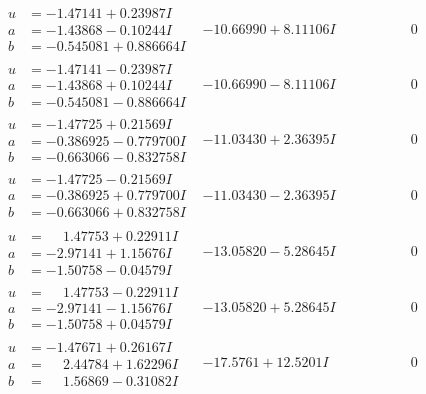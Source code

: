 \documentclass[1p]{elsarticle_modified}
\theoremstyle{definition}
\begin{document}
$$\begin{array}{c|c|c}
\begin{aligned}
u &= -1.47141 + 0.23987 I \\
a &= -1.43868 - 0.10244 I \\
b &= -0.545081 + 0.886664 I\end{aligned}
 & -10.66990 + 8.11106 I & \phantom{-0.000000 } 0 \\ \hline\begin{aligned}
u &= -1.47141 - 0.23987 I \\
a &= -1.43868 + 0.10244 I \\
b &= -0.545081 - 0.886664 I\end{aligned}
 & -10.66990 - 8.11106 I & \phantom{-0.000000 } 0 \\ \hline\begin{aligned}
u &= -1.47725 + 0.21569 I \\
a &= -0.386925 - 0.779700 I \\
b &= -0.663066 - 0.832758 I\end{aligned}
 & -11.03430 + 2.36395 I & \phantom{-0.000000 } 0 \\ \hline\begin{aligned}
u &= -1.47725 - 0.21569 I \\
a &= -0.386925 + 0.779700 I \\
b &= -0.663066 + 0.832758 I\end{aligned}
 & -11.03430 - 2.36395 I & \phantom{-0.000000 } 0 \\ \hline\begin{aligned}
u &= \phantom{-}1.47753 + 0.22911 I \\
a &= -2.97141 + 1.15676 I \\
b &= -1.50758 - 0.04579 I\end{aligned}
 & -13.05820 - 5.28645 I & \phantom{-0.000000 } 0 \\ \hline\begin{aligned}
u &= \phantom{-}1.47753 - 0.22911 I \\
a &= -2.97141 - 1.15676 I \\
b &= -1.50758 + 0.04579 I\end{aligned}
 & -13.05820 + 5.28645 I & \phantom{-0.000000 } 0 \\ \hline\begin{aligned}
u &= -1.47671 + 0.26167 I \\
a &= \phantom{-}2.44784 + 1.62296 I \\
b &= \phantom{-}1.56869 - 0.31082 I\end{aligned}
 & -17.5761 + 12.5201 I & \phantom{-0.000000 } 0 \\ \hline\begin{aligned}

\end{aligned}
\end{array}$$
\end{document}
